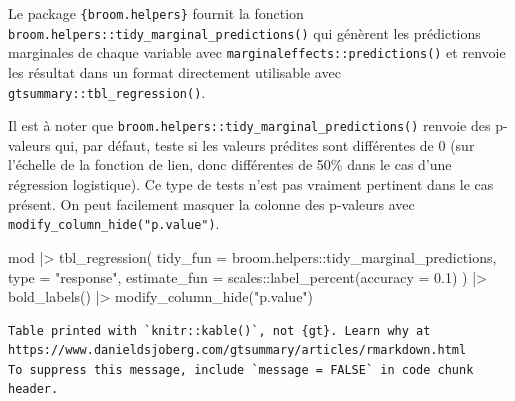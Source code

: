 \documentclass[
  letterpaper,
  DIV=11,
  numbers=noendperiod,
  oneside]{scrreprt}
\newenvironment{Shaded}{\begin{snugshade}}{\end{snugshade}}
\newcommand{\AttributeTok}[1]{\textcolor[rgb]{0.40,0.45,0.13}{#1}}
\newcommand{\FloatTok}[1]{\textcolor[rgb]{0.68,0.00,0.00}{#1}}
\newcommand{\FunctionTok}[1]{\textcolor[rgb]{0.28,0.35,0.67}{#1}}
\newcommand{\NormalTok}[1]{\textcolor[rgb]{0.00,0.23,0.31}{#1}}
\newcommand{\SpecialCharTok}[1]{\textcolor[rgb]{0.37,0.37,0.37}{#1}}
\newcommand{\StringTok}[1]{\textcolor[rgb]{0.13,0.47,0.30}{#1}}
\begin{document}
Le package \texttt{\{broom.helpers\}} fournit la fonction
\texttt{broom.helpers::tidy\_marginal\_predictions()} qui génèrent les
prédictions marginales de chaque variable avec
\texttt{marginaleffects::predictions()} et renvoie les résultat dans un
format directement utilisable avec
\texttt{gtsummary::tbl\_regression()}.

\begin{tcolorbox}[enhanced jigsaw, colbacktitle=quarto-callout-note-color!10!white, opacityback=0, toprule=.15mm, colback=white, coltitle=black, bottomtitle=1mm, toptitle=1mm, titlerule=0mm, rightrule=.15mm, title=\textcolor{quarto-callout-note-color}{\faInfo}\hspace{0.5em}{Note}, breakable, bottomrule=.15mm, opacitybacktitle=0.6, arc=.35mm, left=2mm, leftrule=.75mm, colframe=quarto-callout-note-color-frame]

Il est à noter que \texttt{broom.helpers::tidy\_marginal\_predictions()}
renvoie des p-valeurs qui, par défaut, teste si les valeurs prédites
sont différentes de 0 (sur l'échelle de la fonction de lien, donc
différentes de 50\% dans le cas d'une régression logistique). Ce type de
tests n'est pas vraiment pertinent dans le cas présent. On peut
facilement masquer la colonne des p-valeurs avec
\texttt{modify\_column\_hide("p.value")}.

\end{tcolorbox}

\begin{Shaded}
\begin{Highlighting}[]
\NormalTok{mod }\SpecialCharTok{|\textgreater{}} 
  \FunctionTok{tbl\_regression}\NormalTok{(}
    \AttributeTok{tidy\_fun =}\NormalTok{ broom.helpers}\SpecialCharTok{::}\NormalTok{tidy\_marginal\_predictions,}
    \AttributeTok{type =} \StringTok{"response"}\NormalTok{,}
    \AttributeTok{estimate\_fun =}\NormalTok{ scales}\SpecialCharTok{::}\FunctionTok{label\_percent}\NormalTok{(}\AttributeTok{accuracy =} \FloatTok{0.1}\NormalTok{)}
\NormalTok{  ) }\SpecialCharTok{|\textgreater{}} 
  \FunctionTok{bold\_labels}\NormalTok{() }\SpecialCharTok{|\textgreater{}} 
  \FunctionTok{modify\_column\_hide}\NormalTok{(}\StringTok{"p.value"}\NormalTok{)}
\end{Highlighting}
\end{Shaded}

\begin{verbatim}
Table printed with `knitr::kable()`, not {gt}. Learn why at
https://www.danieldsjoberg.com/gtsummary/articles/rmarkdown.html
To suppress this message, include `message = FALSE` in code chunk header.
\end{verbatim}
\end{document}
